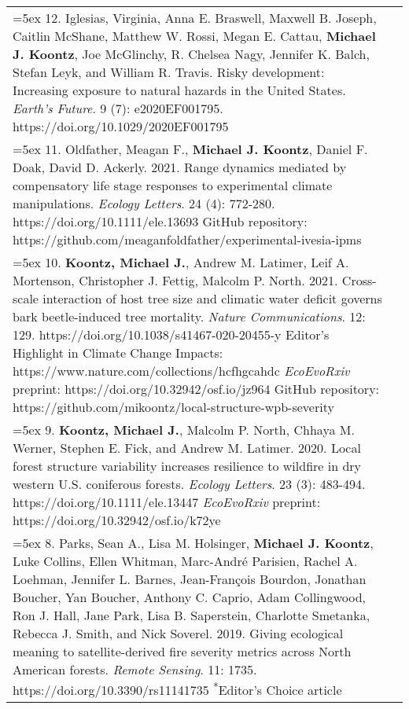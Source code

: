 \begin{longtable}{@{} >{\raggedright}p{6.25in} >{\raggedleft}X @{}}

\hangindent=5ex 12. Iglesias, Virginia, Anna E. Braswell, Maxwell B. Joseph, Caitlin McShane, Matthew W. Rossi, Megan E. Cattau, \textbf{Michael J. Koontz}, Joe McGlinchy, R. Chelsea Nagy, Jennifer K. Balch, Stefan Leyk, and William R. Travis. Risky development: Increasing exposure to natural hazards in the United States. \emph{Earth's Future}. 9 (7): e2020EF001795. https://doi.org/10.1029/2020EF001795 & \tabularnewline

\hangindent=5ex 11. Oldfather, Meagan F., \textbf{Michael J. Koontz}, Daniel F. Doak, David D. Ackerly. 2021. Range dynamics mediated by compensatory life stage responses to experimental climate manipulations. \emph{Ecology Letters}. 24 (4): 772-280. https://doi.org/10.1111/ele.13693
\newline GitHub repository: https://github.com/meaganfoldfather/experimental-ivesia-ipms & \tabularnewline

\hangindent=5ex 10. \textbf{Koontz, Michael J.}, Andrew M. Latimer, Leif A. Mortenson, Christopher J. Fettig, Malcolm P. North. 2021. Cross-scale interaction of host tree size and climatic water deficit governs bark beetle-induced tree mortality. \emph{Nature Communications}. 12: 129. https://doi.org/10.1038/s41467-020-20455-y
\newline *Editor's Highlight in Climate Change Impacts: https://www.nature.com/collections/hcfhgcahdc
\newline \emph{EcoEvoRxiv} preprint: https://doi.org/10.32942/osf.io/jz964
\newline GitHub repository: https://github.com/mikoontz/local-structure-wpb-severity & \tabularnewline

\hangindent=5ex 9. \textbf{Koontz, Michael J.}, Malcolm P. North, Chhaya M. Werner, Stephen E. Fick, and Andrew M. Latimer. 2020. Local forest structure variability increases resilience to wildfire in dry western U.S. coniferous forests. \emph{Ecology Letters}. 23 (3): 483-494. https://doi.org/10.1111/ele.13447 \newline \emph{EcoEvoRxiv} preprint: https://doi.org/10.32942/osf.io/k72ye & \tabularnewline

\hangindent=5ex 8. Parks, Sean A., Lisa M. Holsinger, \textbf{Michael J. Koontz}, Luke Collins, Ellen Whitman, Marc-Andr\'e Parisien, Rachel A. Loehman, Jennifer L. Barnes, Jean-Fran\c{c}ois Bourdon, Jonathan Boucher, Yan Boucher, Anthony C. Caprio, Adam Collingwood, Ron J. Hall, Jane Park, Lisa B. Saperstein, Charlotte Smetanka, Rebecca J. Smith, and Nick Soverel. 2019. Giving ecological meaning to satellite-derived fire severity metrics across North American forests. \emph{Remote Sensing}. 11: 1735. https://doi.org/10.3390/rs11141735 \newline \textsuperscript{*}Editor's Choice article & \tabularnewline


\end{longtable}
